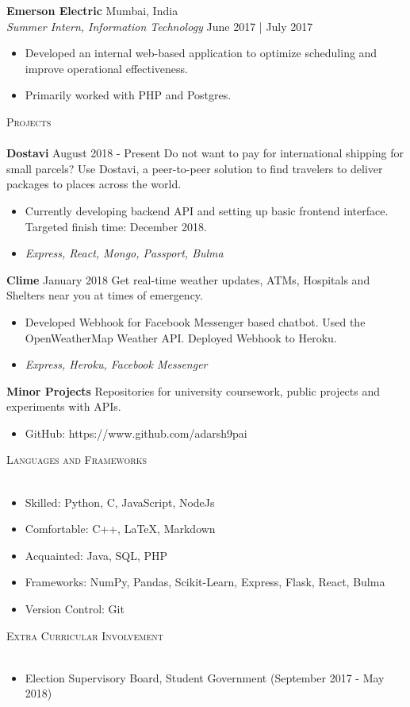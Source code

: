\documentclass[a4paper]{article}
\newcommand{\lineunder} {
    \vspace*{-8pt} \\
    \hspace*{-18pt} \hrulefill \\
}
\newcommand{\header} [1] {
    {\hspace*{-18pt}\vspace*{6pt} \textsc{#1}}
    \vspace*{-6pt} \lineunder
}
\begin{document}
\textbf{Emerson Electric} \hfill Mumbai, India\\
\textit{Summer Intern, Information Technology} \hfill June 2017 | July 2017\\
\vspace{-1mm}
\begin{itemize} \itemsep 1pt
	\item Developed an internal web-based application to optimize scheduling and improve operational effectiveness.
	\item Primarily worked with PHP and Postgres.
\end{itemize}


\vspace{2mm}

\header{Projects}
{\textbf{Dostavi}} August 2018 - Present \hspace{1mm} Do not want to pay for international shipping for small parcels? Use Dostavi, a peer-to-peer solution to find travelers to deliver packages to places across the world. 
\begin{itemize}
\item Currently developing backend API and setting up basic frontend interface. Targeted finish time: December 2018.
\item \textit{Express, React, Mongo, Passport, Bulma} 
\end{itemize}
\vspace*{2mm}
{\textbf{Clime}} January 2018 \hspace{1mm} Get real-time weather updates, ATMs, Hospitals and Shelters near you at times of emergency.
\begin{itemize}
\item Developed Webhook for Facebook Messenger based chatbot. Used the OpenWeatherMap Weather API. Deployed Webhook to Heroku.
\item \textit{Express, Heroku, Facebook Messenger}
\end{itemize}
\textbf{Minor Projects} Repositories for university coursework, public projects and experiments with APIs. 
\begin{itemize}
\item GitHub: https://www.github.com/adarsh9pai
\end{itemize}
\vspace{2mm}

\header{Languages and Frameworks}
\begin{itemize}
\item Skilled: Python, C, JavaScript, NodeJs
\item Comfortable: C++, \LaTeX, Markdown
\item Acquainted: Java, SQL, PHP
\item Frameworks: NumPy, Pandas, Scikit-Learn, Express, Flask, React, Bulma
\item Version Control: Git
\end{itemize}

\vspace{2mm}

\header{Extra Curricular Involvement}
\begin{itemize}
\item Election Supervisory Board, Student Government (September 2017 - May 2018)
\end{itemize}
\vspace{1mm}
\end{document}

